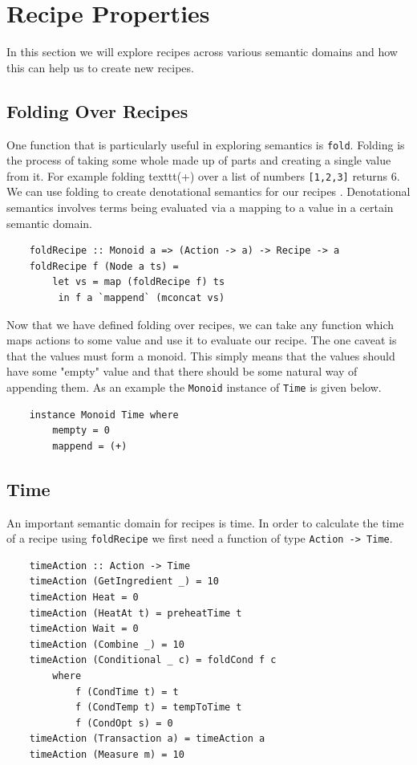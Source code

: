 \documentclass[11pt]{article}
\begin{document}
\section{Recipe Properties}

In this section we will explore recipes across various semantic domains and how this can
help us to create new recipes.

\subsection{Folding Over Recipes}

One function that is particularly useful in exploring semantics is \texttt{fold}.
Folding is the process of taking some whole made up of parts and creating a single
value from it. For example folding texttt{(+)} over a list of numbers \texttt{[1,2,3]}
returns 6. We can use folding to create denotational semantics for our recipes \cite{hutton}.
Denotational semantics involves terms being evaluated via a mapping to a value in a certain
semantic domain.

\begin{lstlisting}
    foldRecipe :: Monoid a => (Action -> a) -> Recipe -> a
    foldRecipe f (Node a ts) =
        let vs = map (foldRecipe f) ts
         in f a `mappend` (mconcat vs)
\end{lstlisting}

Now that we have defined folding over recipes, we can take any function which maps actions
to some value and use it to evaluate our recipe. The one caveat is that the values must form
a monoid. This simply means that the values should have some "empty" value and that there should
be some natural way of appending them. As an example the \texttt{Monoid} instance of
\texttt{Time} is given below.

\begin{lstlisting}
    instance Monoid Time where
        mempty = 0
        mappend = (+)
\end{lstlisting}

\subsection{Time}

An important semantic domain for recipes is time. In order to calculate the
time of a recipe using \texttt{foldRecipe} we first need a function of type \texttt{Action -> Time}.

\begin{lstlisting}
    timeAction :: Action -> Time
    timeAction (GetIngredient _) = 10
    timeAction Heat = 0
    timeAction (HeatAt t) = preheatTime t
    timeAction Wait = 0
    timeAction (Combine _) = 10
    timeAction (Conditional _ c) = foldCond f c
        where
            f (CondTime t) = t
            f (CondTemp t) = tempToTime t
            f (CondOpt s) = 0
    timeAction (Transaction a) = timeAction a
    timeAction (Measure m) = 10
\end{lstlisting}
\end{document}
